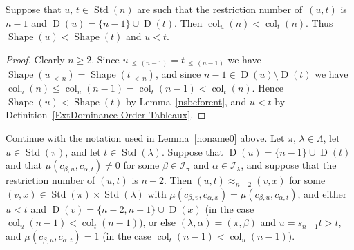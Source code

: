 \documentclass[ALCO,ThmDefs,Unicode,epreuves]{cedram}
\DeclareMathOperator{\col}{col}
\newcommand{\lessthan}[2]{#1\,{_{<\,#2}}}
\newcommand{\Lessthan}[2]{#1\,{_{\leqslant\,#2}}}
\DeclareMathOperator{\STD}{Std}
\DeclareMathOperator{\shape}{Shape}
\DeclareMathOperator{\D}{D}
\begin{document}
\begin{lemm}\label{nminus1order0}
Suppose that $u,\,t\in\STD(n)$ are such that the restriction number of~$(u,t)$
is $n-1$ and $\D(u) = \{n-1\} \cup \D(t)$. Then
$\col_u(n)<\col_t(n)$. Thus $\shape(u)<\shape(t)$ and $u<t$.
\end{lemm}

\begin{proof}
Clearly $n\geqslant 2$. Since $\Lessthan u{(n-1)}=\Lessthan t{(n-1)}$
we have $\shape(\lessthan un)=\shape(\lessthan tn)$, and
since $n-1\in\D(u)\setminus\D(t)$ we have
$\col_u(n)\leqslant\col_u(n-1)=\col_t(n-1)<\col_t(n)$.
Hence $\shape(u)<\shape(t)$ by Lemma~\ref{nsbeforent}, and $u<t$
by Definition~\ref{ExtDominance Order Tableaux}.
\end{proof}

\begin{lemm}\label{nminus1order}
Continue with the notation used in Lemma~\ref{noname0} above. Let
$\pi,\,\lambda\in\Lambda$, let $u\in\STD(\pi)$, and let $t\in\STD(\lambda)$.
Suppose that $\D(u) = \{n-1\} \cup \D(t)$ and that $\mu(c_{\beta,u},c_{\alpha,t}) \neq 0$
for some $\beta\in\mathcal{I}_{\pi}$ and $\alpha\in\mathcal{I}_{\lambda}$,
and suppose that the restriction number of $(u,t)$ is $n-2$.
Then $(u,t)\approx_{n-2} (v,x)$ for some
$(v,x)\in\STD(\pi)\times\STD(\lambda)$ with
$\mu(c_{\beta,v},c_{\alpha,x})=\mu(c_{\beta,u},c_{\alpha,t})$, and
either $u<t$ and $\D(v) = \{n-2,n-1\} \cup \D(x)$
(in the case $\col_u(n-1)<\col_t(n-1)$), or else $(\lambda,\alpha)=(\pi,\beta)$
and $u=s_{n-1}t>t$, and $\mu(c_{\beta,u},c_{\alpha,t}) = 1$ (in the
case $\col_t(n-1)<\col_u(n-1)$).
\end{lemm}
\end{document}
